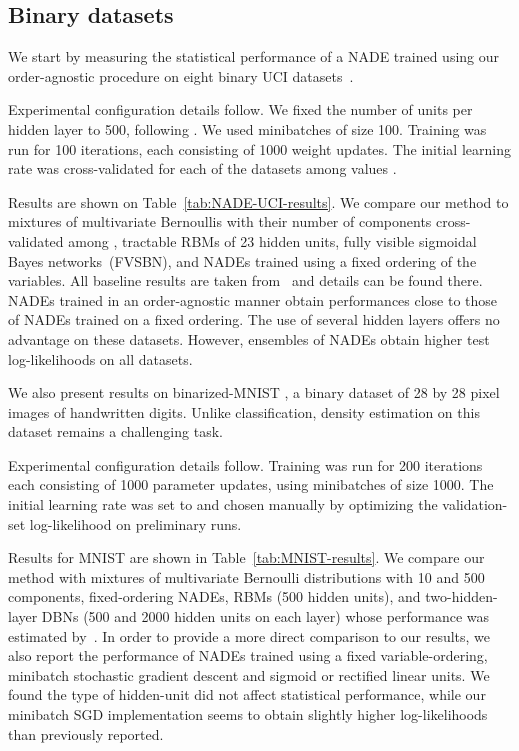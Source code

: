 \documentclass{article}
\begin{document}
\subsection{Binary datasets}

We start by measuring the statistical performance of a NADE trained using our
order-agnostic procedure on eight binary UCI
datasets~\cite{Bache+Lichman:2013}.

Experimental configuration details follow. We fixed the number of units per
hidden layer to 500, following \citet{Larochelle+Murray-2011}. We used minibatches
of size 100. Training was run for 100 iterations, each consisting of 1000 weight
updates. The initial learning rate was cross-validated for each of the datasets
among values .

Results are shown on Table~\ref{tab:NADE-UCI-results}. We compare our method
to mixtures of multivariate Bernoullis with their number of components
cross-validated among , tractable RBMs of 23 hidden
units, fully visible sigmoidal Bayes networks~(FVSBN), and NADEs trained using a
fixed ordering of the variables. All baseline results are taken
from~\citet{Larochelle+Murray-2011} and details can be found there. NADEs
trained in an order-agnostic manner obtain performances close to those of NADEs
trained on a fixed ordering. The use of several hidden layers offers no
advantage on these datasets. However, ensembles of NADEs obtain higher
test log-likelihoods on all datasets.

We also present results on binarized-MNIST \citep{Salakhutdinov+Murray-2008}, a
binary dataset of 28 by 28 pixel images of handwritten digits. Unlike
classification, density estimation on this dataset remains a challenging task.

Experimental configuration details follow. Training was run for 200 iterations
each consisting of 1000 parameter updates, using minibatches of size 1000. The
initial learning rate was set to  and chosen manually by optimizing the
validation-set log-likelihood on preliminary runs.

Results for MNIST are shown in Table~\ref{tab:MNIST-results}. We compare our
method with mixtures of multivariate Bernoulli distributions with 10 and 500
components, fixed-ordering NADEs, RBMs (500 hidden units), and
two-hidden-layer DBNs (500 and 2000 hidden units on each layer) whose
performance was estimated by~\citet{Salakhutdinov+Murray-2008, MurraySal09}. In
order to provide a more direct comparison to our results, we also report the
performance of NADEs trained using a fixed variable-ordering, minibatch
stochastic gradient descent and sigmoid or rectified linear units. We found the
type of hidden-unit did not affect statistical performance, while our minibatch
SGD implementation seems to obtain slightly higher log-likelihoods than
previously reported.
\end{document}
